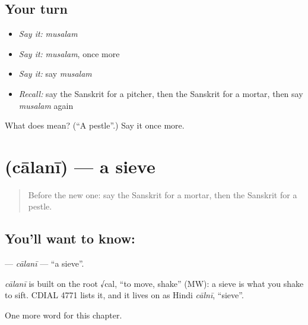 \subsection*{Your turn}
\begin{itemize}
\raggedright
  \item \emph{Say it:} \emph{musalam}
  \item \emph{Say it:} \emph{musalam}, once more
  \item \emph{Say it:} say \emph{musalam}
  \item \emph{Recall:} say the Sanskrit for a pitcher, then the Sanskrit for a mortar, then say \emph{musalam} again
\end{itemize}

\begin{tcolorbox}[breakable,colback=teal!4,colframe=teal!35!black,title={Before you move on}]
What does  mean? (\textquotedblleft{}A pestle\textquotedblright{}.) Say it once more.
\end{tcolorbox}
\section[\texorpdfstring{\sk{चालनी} (cālanī)}{चालनी (cālanī)}]{ (cālanī) — a sieve}

\label{lesson:SA-C191-calani}



\begin{quote}
Before the new one: say the Sanskrit for a mortar, then the Sanskrit for a pestle.
\end{quote}

\subsection*{You'll want to know: }
\textbf{} — \emph{cālanī} — \textquotedblleft{}a sieve\textquotedblright{}.

\begin{cousinweb}
\emph{cālanī} is built on the root √cal, \textquotedblleft{}to move, shake\textquotedblright{} (MW): a sieve is what you shake to sift. CDIAL 4771 lists it, and it lives on as Hindi \emph{cālnī}, \textquotedblleft{}sieve\textquotedblright{}.
\end{cousinweb}

\begin{grammarlens}[title={What you've built}]
One more word for this chapter.
\end{grammarlens}

